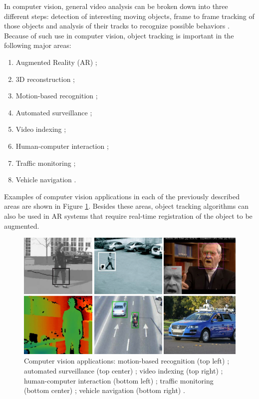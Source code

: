 In computer vision, general video analysis can be broken down into three different steps: detection of interesting moving objects, frame to frame tracking of those objects and analysis of their tracks to recognize possible behaviors \cite{Yilmaz2006}. Because of such use in computer vision, object tracking is important in the following major areas:

\begin{enumerate}
  \item Augmented Reality (AR) \cite{Azuma1997};
  \item 3D reconstruction \cite{Zhou2008};
  \item Motion-based recognition \cite{Cedras1995};
  \item Automated surveillance \cite{Javed2002};
  \item Video indexing \cite{Javed2002};
  \item Human-computer interaction \cite{Ren2010};
  \item Traffic monitoring \cite{Gloyer1994};
  \item Vehicle navigation \cite{Jia2009}.
\end{enumerate}

Examples of computer vision applications in each of the previously described areas are shown in Figure \ref{figure:cv_applications}. Besides these areas, object tracking algorithms can also be used in AR systems that require real-time registration of the object to be augmented.

\begin{figure}[!htb]
  \centering
  \includegraphics[width=\linewidth]{chapters/basic_concepts/cv_applications.png}
  \caption{Computer vision applications: motion-based recognition (top left) \cite{Cedras1995}; automated surveillance (top center) \cite{Javed2002}; video indexing (top right) \cite{Javed2002}; human-computer interaction (bottom left) \cite{Ren2010}; traffic monitoring (bottom center) \cite{Gloyer1994}; vehicle navigation (bottom right) \cite{Jia2009}.}
  \label{figure:cv_applications}
\end{figure}

